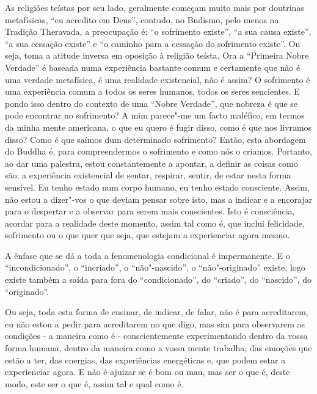 As religiões teístas por seu lado, geralmente começam muito mais por
doutrinas metafísicas, ``eu acredito em Deus'', contudo, no Budismo,
pelo menos na Tradição Theravada, a preocupação é: ``o sofrimento
existe'', ``a sua causa existe'', ``a sua cessação existe'' e ``o
caminho para a cessação do sofrimento existe''. Ou seja, toma a atitude
inversa em oposição à religião teísta. Ora a ``Primeira Nobre Verdade''
é baseada numa experiência bastante comum e certamente que não é uma
verdade metafísica, é uma realidade existencial, não é assim? O
sofrimento é uma experiência comum a todos os seres humanos, todos os
seres sencientes. E pondo isso dentro do contexto de uma ``Nobre
Verdade'', que nobreza é que se pode encontrar no sofrimento? A mim
parece"-me um facto maléfico, em termos da minha mente americana, o que
eu quero é fugir disso, como é que nos livramos disso? Como é que saímos
dum determinado sofrimento? Então, esta abordagem do Buddha é, para
compreendermos o sofrimento e como nós o criamos. Portanto, ao dar uma
palestra, estou constantemente a apontar, a definir as coisas como são;
a experiência existencial de sentar, respirar, sentir, de estar nesta
forma sensível. Eu tenho estado num corpo humano, eu tenho estado
consciente. Assim, não estou a dizer"-vos o que deviam pensar sobre isto,
mas a indicar e a encorajar para o despertar e a observar para serem
mais conscientes. Isto é consciência, acordar para a realidade deste
momento, assim tal como é, que inclui felicidade, sofrimento ou o que
quer que seja, que estejam a experienciar agora mesmo.

A ênfase que se dá a toda a fenomenologia condicional é impermanente. E
o ``incondicionado'', o ``incriado'', o ``não"-nascido'', o
``não"-originado'' existe, logo existe também a saída para fora do
``condicionado'', do ``criado'', do ``nascido'', do ``originado''.

Ou seja, toda esta forma de ensinar, de indicar, de falar, não é para
acreditarem, eu não estou a pedir para acreditarem no que digo, mas sim
para observarem as condições - a maneira como é - conscientemente
experimentando dentro da vossa forma humana, dentro da maneira como a
vossa mente trabalha; das emoções que estão a ter, das energias, das
experiências energéticas e, que podem estar a experienciar agora. E não
é ajuizar se é bom ou mau, mas ser o que é, deste modo, este ser o que
é, assim tal e qual como é.

